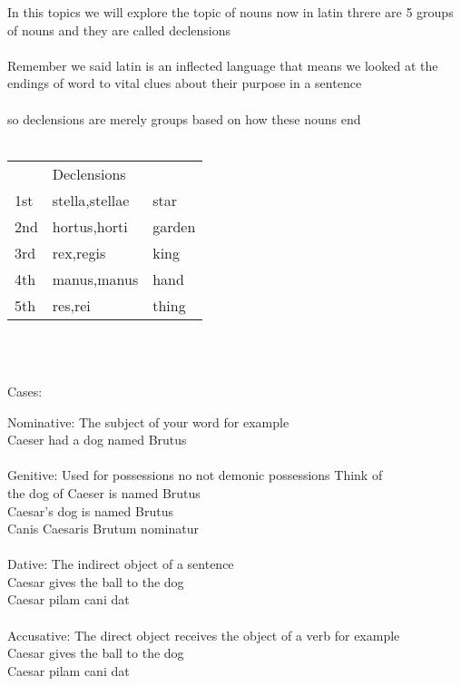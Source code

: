 In this topics we will explore the topic of nouns now in latin
threre are 5 groups of nouns and they are called declensions\\\\ 
Remember we said latin is an inflected language that means we looked
at the endings of word to vital clues about their purpose in a sentence \\\\ 
so declensions are merely groups based on how these nouns end \\ \\
\begin{tabular}{lll}
  & Declensions & \\
  1st & stella,stellae & star \\ 
  2nd & hortus,horti & garden \\ 
  3rd & rex,regis & king \\ 
  4th & manus,manus & hand \\ 
  5th & res,rei & thing \\
\end{tabular}\\ \\
\begin{center}
  \huge Cases: \\
\end{center}
\large{Nominative:}
The subject of your word for example \\ 
Caeser had a dog named Brutus \\ \\ 
\large{Genitive:}
Used for possessions no not demonic possessions Think of \\ 
the dog of Caeser is named Brutus \\ 
Caesar's dog is named Brutus \\ 
Canis Caesaris Brutum nominatur \\ \\
\large{Dative:} The indirect object of a sentence \\ 
Caesar gives the ball to the dog \\ 
Caesar pilam cani dat \\ \\ 
\large{Accusative:} The direct object receives the object of a verb for example \\ 
Caesar gives the ball to the dog \\ 
Caesar pilam cani dat \\ \\ 
